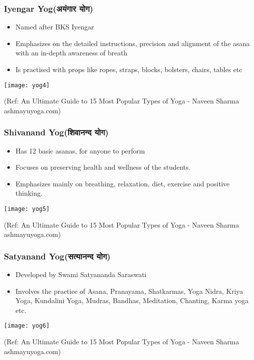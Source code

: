 \begin{frame}[fragile]\frametitle{Iyengar Yog(अयंगार योग)}
	\begin{itemize}
	\item Named after BKS Iyengar
	\item Emphasizes on the detailed instructions, precision and alignment of the asana with an in-depth awareness of breath
	\item Is practised with props like ropes, straps, blocks, bolsters, chairs, tables etc
	\end{itemize}

\begin{center}
\texttt{[image: yog4]}

\tiny{(Ref: An Ultimate Guide to 15 Most Popular Types of Yoga - Naveen Sharma ashmayuyoga.com)}
\end{center}

\end{frame}

\begin{frame}[fragile]\frametitle{Shivanand Yog(शिवानन्द योग)}
	\begin{itemize}
	\item Has 12 basic asanas, for anyone to perform
	\item Focuses on preserving health and wellness of the students. 
	\item Emphasizes mainly on breathing, relaxation, diet, exercise and positive thinking.
	\end{itemize}

\begin{center}
\texttt{[image: yog5]}

\tiny{(Ref: An Ultimate Guide to 15 Most Popular Types of Yoga - Naveen Sharma ashmayuyoga.com)}
\end{center}

\end{frame}

\begin{frame}[fragile]\frametitle{Satyanand Yog(सत्यानन्द योग)}
	\begin{itemize}
	\item Developed by Swami Satyananda Saraswati
	\item Involves the practice of Asana, Pranayama, Shatkarmas, Yoga Nidra, Kriya Yoga, Kundalini Yoga, Mudras, Bandhas, Meditation, Chanting, Karma yoga etc.
	\end{itemize}

\begin{center}
\texttt{[image: yog6]}

\tiny{(Ref: An Ultimate Guide to 15 Most Popular Types of Yoga - Naveen Sharma ashmayuyoga.com)}
\end{center}

\end{frame}

